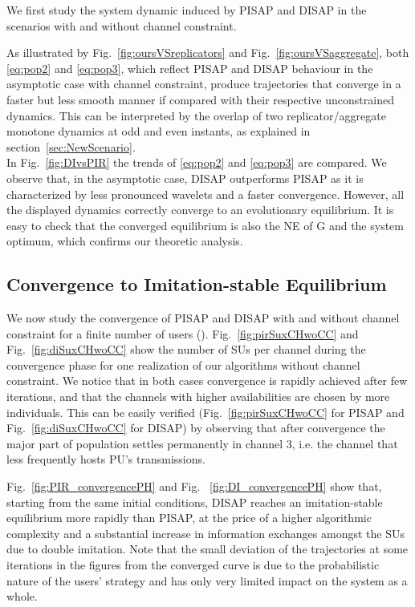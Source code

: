 \documentclass[12pt, onecolumn]{IEEEtran}
\theoremstyle{plain}
\theoremstyle{definition}
\begin{document}
We first study the system dynamic induced by PISAP and DISAP in the scenarios with and without channel constraint.

As illustrated by Fig.~\ref{fig:oursVSreplicators} and Fig.~\ref{fig:oursVSaggregate},
both \eqref{eq:pop2} and \eqref{eq:pop3}, which reflect PISAP and DISAP behaviour in the asymptotic case with channel constraint, produce trajectories that converge in a faster but less smooth manner if compared with
their respective unconstrained dynamics. This can be interpreted by the overlap of two replicator/aggregate monotone dynamics at odd and even instants, as
explained in section~\ref{sec:NewScenario}.\\
In Fig.~\ref{fig:DIvsPIR} the trends of \eqref{eq:pop2} and \eqref{eq:pop3} are compared. We observe that, in the asymptotic case, DISAP outperforms PISAP as it is characterized by less
pronounced wavelets and a faster convergence. However, all the displayed dynamics correctly converge
to an evolutionary equilibrium. It is easy to check that the converged equilibrium is also the NE of G and the system optimum, which confirms our theoretic analysis.


\subsection{Convergence to Imitation-stable Equilibrium}
We now study the convergence of PISAP and DISAP with and without channel constraint for a finite number of users (). Fig.~\ref{fig:pirSuxCHwoCC} and Fig.~\ref{fig:diSuxCHwoCC} show the number
of SUs per channel during the convergence phase for one realization of our algorithms without channel constraint.
We notice that in both cases convergence is rapidly achieved after few iterations, and that the channels with higher availabilities are
chosen by more individuals. This can be easily verified (Fig.~\ref{fig:pirSuxCHwoCC} for PISAP and Fig.~\ref{fig:diSuxCHwoCC} for DISAP) by observing that after
convergence the major part of population settles permanently in channel 3, i.e. the channel that less frequently hosts PU's transmissions.


Fig.~\ref{fig:PIR_convergencePH} and Fig.~ \ref{fig:DI_convergencePH} show that, starting from the same initial conditions, DISAP reaches an imitation-stable equilibrium more rapidly than PISAP,
at the price of a higher algorithmic complexity and a substantial increase in information exchanges amongst the SUs due to double imitation.
Note that the small deviation of the trajectories at some iterations in the figures from the converged curve is due to the
probabilistic nature of the users' strategy and has only very limited impact on the system as a whole.
\end{document}
